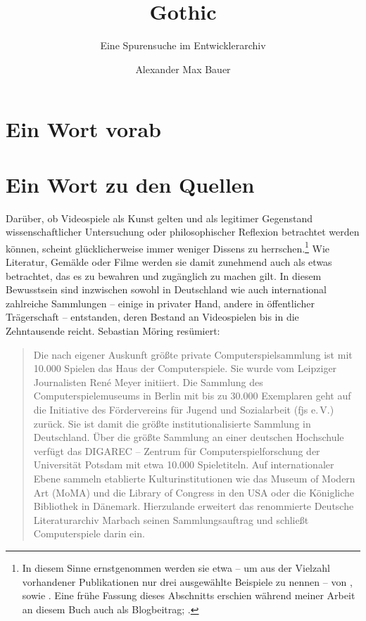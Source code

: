 \documentclass[a5paper,pagesize,numbers=noenddot]{scrbook}
\title{Gothic}
\subtitle{Eine Spurensuche im Entwicklerarchiv}
\author{Alexander Max Bauer}
\date{}
\begin{document}
\maketitle


\frontmatter
\tableofcontents


\mainmatter
\chapter{Ein Wort vorab}\label{ch:vorwort}


\chapter{Ein Wort zu den Quellen}\label{ch:quellen}
Darüber, ob Videospiele als Kunst gelten und als legitimer Gegenstand wissenschaftlicher Untersuchung oder philosophischer Reflexion betrachtet werden können, scheint glücklicherweise immer weniger Dissens zu herrschen.\footnote{In diesem Sinne ernstgenommen werden sie etwa -- um aus der Vielzahl vorhandener Publikationen nur drei ausgewählte Beispiele zu nennen -- von \autocite{feige_computerspiele_2015}, \autocite{zimmermann_gameskultur_2020} sowie \autocite{beil_game_2018}. Eine frühe Fassung dieses Abschnitts erschien während meiner Arbeit an diesem Buch auch als Blogbeitrag; \autocite[vgl.][]{bauer_sammeln_2025}.}
Wie Literatur, Gemälde oder Filme werden sie damit zunehmend auch als etwas betrachtet, das es zu bewahren und zugänglich zu machen gilt.
In diesem Bewusstsein sind inzwischen sowohl in Deutschland wie auch international zahlreiche Sammlungen -- einige in privater Hand, andere in öffentlicher Trägerschaft -- entstanden, deren Bestand an Videospielen bis in die Zehntausende reicht.
Sebastian Möring resümiert:

\begin{quote}
   Die nach eigener Auskunft größte private Computerspielsammlung ist mit 10.000 Spielen das Haus der Computerspiele.
   Sie wurde vom Leipziger Journalisten René Meyer initiiert.
   Die Sammlung des Computerspielemuseums in Berlin mit bis zu 30.000 Exemplaren geht auf die Initiative des Fördervereins für Jugend und Sozialarbeit (fjs e.\,V.) zurück.
   Sie ist damit die größte institutionalisierte Sammlung in Deutschland.
   Über die größte Sammlung an einer deutschen Hochschule verfügt das DIGAREC -- Zentrum für Computerspielforschung der Universität Potsdam mit etwa 10.000 Spieletiteln.
   Auf internationaler Ebene sammeln etablierte Kulturinstitutionen wie das Museum of Modern Art (MoMA) und die Library of Congress in den USA oder die Königliche Bibliothek in Dänemark.
   Hierzulande erweitert das renommierte Deutsche Literaturarchiv Marbach seinen Sammlungsauftrag und schließt Computerspiele darin ein.\autocite[S.~120]{moering_kulturarchive_2020}
\end{quote}
\end{document}

